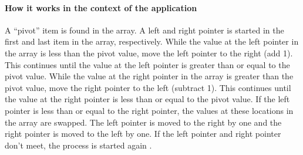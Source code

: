 \paragraph{How it works in the context of the application}
A “pivot” item is found in the array. A left and right pointer is started in the first and last item in the array, respectively. While the value at the left pointer in the array is less than the pivot value, move the left pointer to the right (add 1). This continues until the value at the left pointer is greater than or equal to the pivot value. While the value at the right pointer in the array is greater than the pivot value, move the right pointer to the left (subtract 1). This continues until the value at the right pointer is less than or equal to the pivot value. If the left pointer is less than or equal to the right pointer, the values at these locations in the array are swapped. The left pointer  is moved to the right by one and the right pointer is moved to the left by one. If the left pointer and right pointer don’t meet, the process is started again \cite{quick_sort_geeks}.

